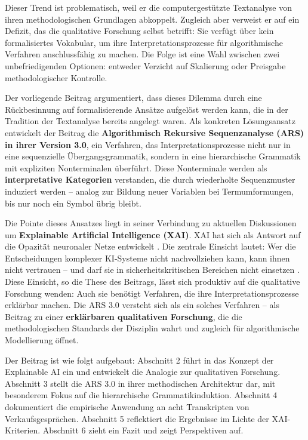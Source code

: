 \documentclass[
  12pt,
  a4paper,
  oneside,
  titlepage
]{article}
\begin{document}
Dieser Trend ist problematisch, weil er die computergestützte Textanalyse von ihren 
methodologischen Grundlagen abkoppelt. Zugleich aber verweist er auf ein Defizit, das 
die qualitative Forschung selbst betrifft: Sie verfügt über kein formalisiertes 
Vokabular, um ihre Interpretationsprozesse für algorithmische Verfahren anschlussfähig 
zu machen. Die Folge ist eine Wahl zwischen zwei unbefriedigenden Optionen: entweder 
Verzicht auf Skalierung oder Preisgabe methodologischer Kontrolle.

Der vorliegende Beitrag argumentiert, dass dieses Dilemma durch eine Rückbesinnung auf 
formalisierende Ansätze aufgelöst werden kann, die in der Tradition der Textanalyse 
bereits angelegt waren. Als konkreten Lösungsansatz entwickelt der Beitrag die 
\textbf{Algorithmisch Rekursive Sequenzanalyse (ARS) in ihrer Version 3.0}, ein Verfahren, 
das Interpretationsprozesse nicht nur in eine sequenzielle Übergangsgrammatik, sondern 
in eine hierarchische Grammatik mit expliziten Nonterminalen überführt. Diese 
Nonterminale werden als \textbf{interpretative Kategorien} verstanden, die durch 
wiederholte Sequenzmuster induziert werden – analog zur Bildung neuer Variablen bei 
Termumformungen, bis nur noch ein Symbol übrig bleibt.

Die Pointe dieses Ansatzes liegt in seiner Verbindung zu aktuellen Diskussionen um 
\textbf{Explainable Artificial Intelligence (XAI)}. XAI hat sich als Antwort auf die 
Opazität neuronaler Netze entwickelt \citep{Samek2019, BarredoArrieta2020}. Die zentrale 
Einsicht lautet: Wer die Entscheidungen komplexer KI-Systeme nicht nachvollziehen kann, 
kann ihnen nicht vertrauen – und darf sie in sicherheitskritischen Bereichen nicht 
einsetzen \citep{Weller2019}. Diese Einsicht, so die These des Beitrags, lässt sich 
produktiv auf die qualitative Forschung wenden: Auch sie benötigt Verfahren, die ihre 
Interpretationsprozesse erklärbar machen. Die ARS 3.0 versteht sich als ein solches 
Verfahren – als Beitrag zu einer \textbf{erklärbaren qualitativen Forschung}, die die 
methodologischen Standards der Disziplin wahrt und zugleich für algorithmische 
Modellierung öffnet.

Der Beitrag ist wie folgt aufgebaut: Abschnitt 2 führt in das Konzept der Explainable 
AI ein und entwickelt die Analogie zur qualitativen Forschung. Abschnitt 3 stellt die 
ARS 3.0 in ihrer methodischen Architektur dar, mit besonderem Fokus auf die 
hierarchische Grammatikinduktion. Abschnitt 4 dokumentiert die empirische Anwendung an 
acht Transkripten von Verkaufsgesprächen. Abschnitt 5 reflektiert die Ergebnisse im 
Lichte der XAI-Kriterien. Abschnitt 6 zieht ein Fazit und zeigt Perspektiven auf.
\end{document}
